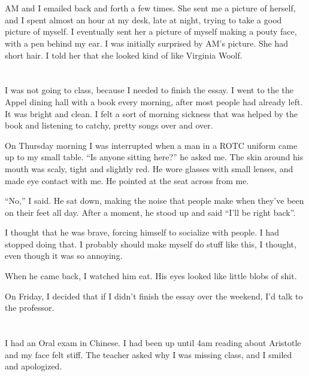 \section{}

AM and I emailed back and forth a few times.  She sent me a picture of herself,
and I spent almost an hour at my desk, late at night, trying to take a good
picture of myself.  I eventually sent her a picture of myself making a pouty
face, with a pen behind my ear.  I was initially surprised by AM's picture.  She
had short hair.  I told her that she looked kind of like Virginia Woolf.  

\section{}

I was not going to class, because I needed to finish the essay.  I went to the
the Appel dining hall with a book every morning, after most people had already
left.  It was bright and clean.  I felt a sort of morning sickness that was
helped by the book and listening to catchy, pretty songs over and over.  

On Thursday morning I was interrupted when a man in a ROTC uniform came up to my
small table.  ``Is anyone sitting here?'' he asked me.  The skin around his
mouth was scaly, tight and slightly red.  He wore glasses with small lenses, and
made eye contact with me.  He pointed at the seat across from me.  

``No,'' I said.  He sat down, making the noise that people make when they've
been on their feet all day.  After a moment, he stood up and said ``I'll be
right back''.  

I thought that he was brave, forcing himself to socialize with people.  I had
stopped doing that.  I probably should make myself do stuff like this, I
thought, even though it was so annoying. 

When he came back, I watched him eat.  His eyes looked like little blobs of
shit.

On Friday, I decided that if I didn't finish the essay over the weekend, I'd
talk to the professor.

\section{}

I had an Oral exam in Chinese.  I had been up until 4am reading about Aristotle
and my face felt stiff.  The teacher asked why I was missing class, and I smiled
and apologized.

